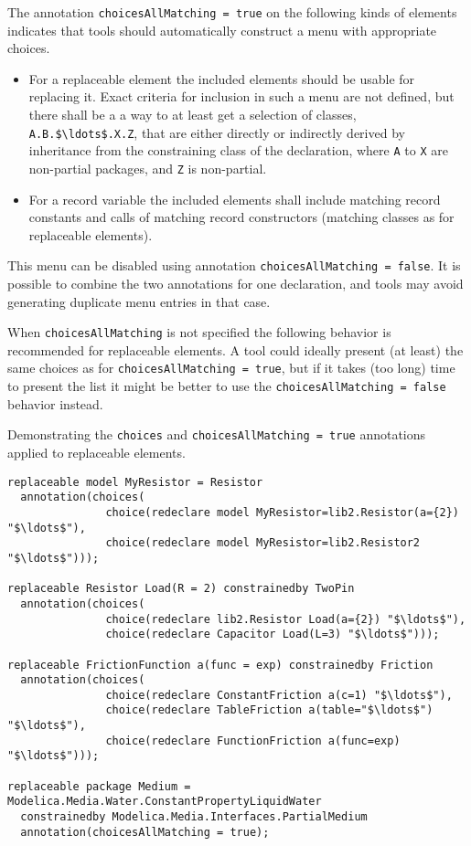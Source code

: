 The annotation \lstinline!choicesAllMatching = true! on the following kinds of elements indicates that tools should automatically construct a menu with appropriate choices.
\begin{itemize}
\item For a replaceable element the included elements should be usable for replacing it.
Exact criteria for inclusion in such a menu are not defined, but there shall be a a way to at least get a selection of classes, \lstinline!A.B.$\ldots$.X.Z!, that are either directly or indirectly derived by inheritance from the constraining class of the declaration, where \lstinline!A! to \lstinline!X! are non-partial packages, and \lstinline!Z! is non-partial.
\item For a record variable the included elements shall include matching record constants and calls of matching record constructors (matching classes as for replaceable elements).
\end{itemize}

This menu can be disabled using annotation \lstinline!choicesAllMatching = false!.
It is possible to combine the two annotations for one declaration, and tools may avoid generating duplicate menu entries in that case.
\begin{nonnormative}
When \lstinline!choicesAllMatching! is not specified the following behavior is recommended for replaceable elements.
A tool could ideally present (at least) the same choices as for \lstinline!choicesAllMatching = true!, but if it takes (too long) time to present the list it might be better to use the \lstinline!choicesAllMatching = false! behavior instead.
\end{nonnormative}

\begin{example}
Demonstrating the \lstinline!choices! and  \lstinline!choicesAllMatching = true! annotations applied to replaceable elements.
\begin{lstlisting}[language=modelica]
replaceable model MyResistor = Resistor
  annotation(choices(
               choice(redeclare model MyResistor=lib2.Resistor(a={2}) "$\ldots$"),
               choice(redeclare model MyResistor=lib2.Resistor2 "$\ldots$")));

replaceable Resistor Load(R = 2) constrainedby TwoPin
  annotation(choices(
               choice(redeclare lib2.Resistor Load(a={2}) "$\ldots$"),
               choice(redeclare Capacitor Load(L=3) "$\ldots$")));

replaceable FrictionFunction a(func = exp) constrainedby Friction
  annotation(choices(
               choice(redeclare ConstantFriction a(c=1) "$\ldots$"),
               choice(redeclare TableFriction a(table="$\ldots$") "$\ldots$"),
               choice(redeclare FunctionFriction a(func=exp) "$\ldots$")));

replaceable package Medium = Modelica.Media.Water.ConstantPropertyLiquidWater
  constrainedby Modelica.Media.Interfaces.PartialMedium
  annotation(choicesAllMatching = true);
\end{lstlisting}
\end{example}

